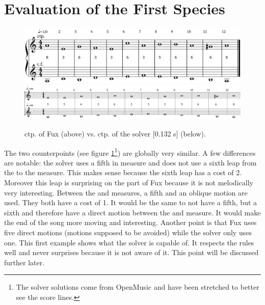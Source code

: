 \section{Evaluation of the First Species}
\begin{figure}[h]
    \centering
    \includegraphics[height=\fhl]{Images/the_first_species.png}
    \includegraphics[width=\textwidth, height=\fhs]{Images/solver_1sp.png}
    \caption{ ctp. of Fux (above) vs. ctp. of the solver [0.132 s] (below).}
    \label{fig:eval_1sp}
\end{figure}
The two counterpoints (see figure \ref{fig:eval_1sp}\footnote{The solver solutions come from OpenMusic and have been stretched to better see the score lines.}) are globally very similar. A few differences are notable: the solver uses a fifth in  measure and does not use a sixth leap from the  to the  measure. This makes sense because the sixth leap has a cost of 2. Moreover this leap is surprising on the part of Fux because it is not melodically very interesting. Between the  and  measures, a fifth and an oblique motion are used. They both have a cost of 1. It would be the same to not have a fifth, but a sixth and therefore have a direct motion between the  and  measure. It would make the end of the song more moving and interesting. Another point is that Fux uses five direct motions (motions supposed to be avoided) while the solver only uses one. This first example shows what the solver is capable of. It respects the rules well and never surprises because it is not aware of it. This point will be discussed further later.

